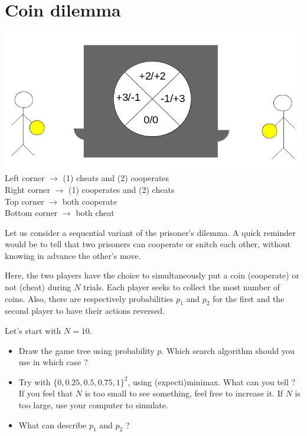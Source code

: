 \documentclass[11pt,a4paper,BCOR12mm, headexclude, footexclude, twoside, openright]{scrartcl}
\numberwithin{equation}{section} %
\numberwithin{figure}{section} %
\numberwithin{table}{section} %
\begin{document}
\section{Coin dilemma}

\begin{center}
\includegraphics[scale=0.5]{coin_game.png}\\
Left corner $\rightarrow$ (1) cheats and (2) cooperates\\
Right corner $\rightarrow$ (1) cooperates and (2) cheats\\
Top corner $\rightarrow$ both cooperate\\
Bottom corner $\rightarrow$ both cheat\\
\end{center}
Let us consider a sequential variant of the prisoner's dilemma. A quick reminder would be to tell that two prisoners can cooperate or snitch each other, without knowing in advance the other's move.

Here, the two players have the choice to simultaneously put a coin (cooperate) or not (cheat) during $N$ trials. Each player seeks to collect the most number of coins. Also, there are respectively  probabilities $p_1$ and $p_2$  for the first and the second player to have their actions reversed.

Let's start with $N = 10$.

\begin{itemize}
	\item Draw the game tree using probability $p$. Which search algorithm should you use in which case ?
	\item Try with $\{0,0.25,0.5,0.75,1\}^2$, using (expecti)minimax. What can you tell ? If you feel that $N$ is too small to see something, feel free to increase it. If $N$ is too large, use your computer to simulate. 
    \item What can describe $p_1$ and $p_2$ ?
\end{itemize}
\end{document}
